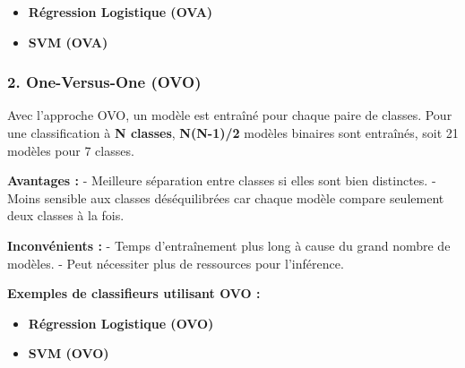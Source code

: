 \documentclass[
]{article}
\providecommand{\tightlist}{%
  \setlength{\itemsep}{0pt}\setlength{\parskip}{0pt}}\usepackage{longtable,booktabs,array}
\begin{document}
\begin{itemize}
\tightlist
\item
  \textbf{Régression Logistique (OVA)}
\item
  \textbf{SVM (OVA)}
\end{itemize}

\subsubsection{2. One-Versus-One (OVO)}\label{one-versus-one-ovo}

Avec l'approche OVO, un modèle est entraîné pour chaque paire de
classes. Pour une classification à \textbf{N classes}, \textbf{N(N-1)/2}
modèles binaires sont entraînés, soit 21 modèles pour 7 classes.

\textbf{Avantages :} - Meilleure séparation entre classes si elles sont
bien distinctes. - Moins sensible aux classes déséquilibrées car chaque
modèle compare seulement deux classes à la fois.

\textbf{Inconvénients :} - Temps d'entraînement plus long à cause du
grand nombre de modèles. - Peut nécessiter plus de ressources pour
l'inférence.

\textbf{Exemples de classifieurs utilisant OVO :}

\begin{itemize}
\tightlist
\item
  \textbf{Régression Logistique (OVO)}
\item
  \textbf{SVM (OVO)}
\end{itemize}
\end{document}
